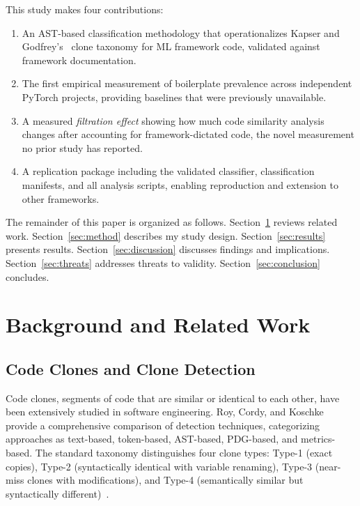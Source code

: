 \documentclass[smallextended,natbib]{svjour3}
\begin{document}
This study makes four contributions:

\begin{enumerate}
\item An AST-based classification methodology that operationalizes Kapser and Godfrey's~\citep{kapser2008} clone taxonomy for ML framework code, validated against framework documentation.
\item The first empirical measurement of boilerplate prevalence across independent PyTorch projects, providing baselines that were previously unavailable.
\item A measured \emph{filtration effect} showing how much code similarity analysis changes after accounting for framework-dictated code, the novel measurement no prior study has reported.
\item A replication package including the validated classifier, classification manifests, and all analysis scripts, enabling reproduction and extension to other frameworks.
\end{enumerate}

The remainder of this paper is organized as follows. Section~\ref{sec:related} reviews related work. Section~\ref{sec:method} describes my study design. Section~\ref{sec:results} presents results. Section~\ref{sec:discussion} discusses findings and implications. Section~\ref{sec:threats} addresses threats to validity. Section~\ref{sec:conclusion} concludes.


\section{Background and Related Work}
\label{sec:related}

\subsection{Code Clones and Clone Detection}

Code clones, segments of code that are similar or identical to each other, have been extensively studied in software engineering. Roy, Cordy, and Koschke~\citep{roy2009} provide a comprehensive comparison of detection techniques, categorizing approaches as text-based, token-based, AST-based, PDG-based, and metrics-based. The standard taxonomy distinguishes four clone types: Type-1 (exact copies), Type-2 (syntactically identical with variable renaming), Type-3 (near-miss clones with modifications), and Type-4 (semantically similar but syntactically different)~\citep{roy2007survey}.
\end{document}
